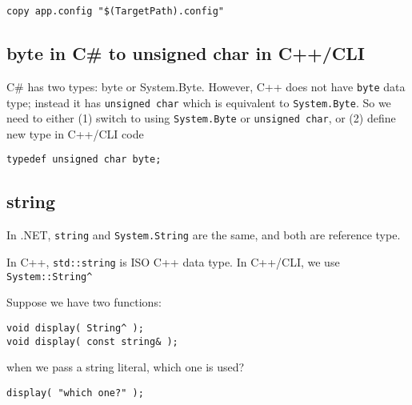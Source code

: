 \begin{verbatim}
copy app.config "$(TargetPath).config"
\end{verbatim}


\subsection{byte in C\# to unsigned char in C++/CLI}

C\# has two types: byte or System.Byte. However, C++ does not have \verb!byte!
data type; instead it has \verb!unsigned char! which is equivalent to
\verb!System.Byte!. So we need to either (1) switch to using \verb!System.Byte!
or \verb!unsigned char!, or (2) define new type in C++/CLI code

\begin{verbatim}
typedef unsigned char byte;
\end{verbatim}

\subsection{string}

In .NET, \verb!string! and \verb!System.String! are the same, and both are
reference type. 

In C++, \verb!std::string! is ISO C++ data type. In C++/CLI, we use
\verb!System::String^! 

Suppose we have two functions:
\begin{verbatim}
void display( String^ );
void display( const string& );
\end{verbatim}
when we pass a string literal, which one is used?
\begin{verbatim}
display( "which one?" );
\end{verbatim}

